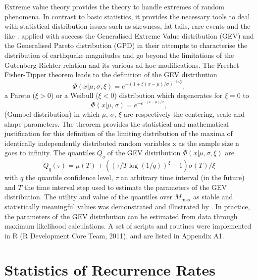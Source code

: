 \documentclass{report}
\begin{document}
Extreme value theory provides the theory to handle extremes of random
phenomena. In contrast to basic statistics, it provides the necessary
tools to deal with statistical distribution issues such as skewness,
fat tails, rare events and the like \cite{embrechts_al97:extremal}.
 applied with success the
Generalised Extreme Value distribution (GEV) and the Generalised
Pareto distribution (GPD) in their attempts to characterise the
distribution of earthquake magnitudes and go beyond the limitations of
the Gutenberg-Richter relation and its various ad-hoc modifications.
The Frechet-Fisher-Tipper theorem \cite{embrechts_al97:extremal} leads
to the definition of the GEV distribution
\begin{equation}
  \label{eq:GEV}
\Phi(x|\mu,\sigma,\xi) = e^{- (1 + \xi (x - \mu)/ \sigma)^{-1/\xi)}},  
\end{equation}
a Pareto ($ξ>0$) or a Weibull ($ξ<0$) distribution which
degenerates for $\xi = 0$ to 
\begin{equation}
  \label{eq:gumbel}
\Phi(x|\mu,\sigma) = e^{-e^{-(x - \mu)/ \sigma}},  
\end{equation}
(Gumbel distribution) in which $\mu$, $\sigma$, $\xi$ are respectively
the centering, scale and shape parameters. The theorem provides the
statistical and mathematical justification for this definition of the
limiting distribution of the maxima of identically independently
distributed random variables x as the sample size n goes to infinity.
The quantiles $Q_q$ of the GEV distribution $\Phi(x|\mu,\sigma,\xi)$ are
\begin{equation}
  \label{eq:quantiles}
Q_q(\tau) = \mu(T) + ((\tau/T \log(1/q))^{\xi} - 1) \sigma(T)/\xi  
\end{equation}
with $q$ the quantile confidence level, $\tau$ an arbitrary time
interval (in the future) and $T$ the time interval step used to
estimate the parameters of the GEV distribution.  The utility and
value of the quantiles over $M_\mathrm{max}$ as stable and statistically
meaningful values was demonstrated and illustrated by
.
In practice, the parameters of the GEV distribution can be estimated
from data through maximum likelihood calculations. A set of scripts
and routines were implemented in R (R Development Core Team, 2011),
and are listed in Appendix A1.

\section{Statistics of Recurrence Rates}
\end{document}
